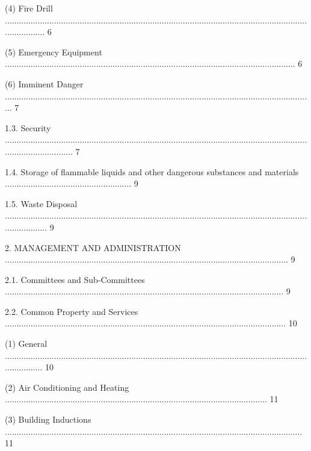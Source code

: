 \documentclass{article}
\begin{document}
{\fontsize{9.962}{1}(4) Fire Drill .................................................................................................................................................. 6 }

{\fontsize{9.962}{1}(5) Emergency Equipment ............................................................................................................................ 6 }

{\fontsize{9.962}{1}(6) Imminent Danger .................................................................................................................................... 7 }

{\fontsize{9.99}{1}1.3. Security .............................................................................................................................................................. 7 }

{\fontsize{9.99}{1}1.4. Storage of flammable liquids and other dangerous substances and materials ...................................................... 9 }

{\fontsize{9.99}{1}1.5. Waste Disposal ................................................................................................................................................... 9 }

{\fontsize{9.99}{1}2. MANAGEMENT AND ADMINISTRATION ......................................................................................................................... 9 }

{\fontsize{9.99}{1}2.1. Committees and Sub-Committees ....................................................................................................................... 9 }

{\fontsize{9.99}{1}2.2. Common Property and Services ........................................................................................................................ 10 }

{\fontsize{9.962}{1}(1) General ................................................................................................................................................. 10 }

{\fontsize{9.962}{1}(2) Air Conditioning and Heating ................................................................................................................ 11 }

{\fontsize{9.962}{1}(3) Building Inductions ............................................................................................................................... 11 }
\end{document}
